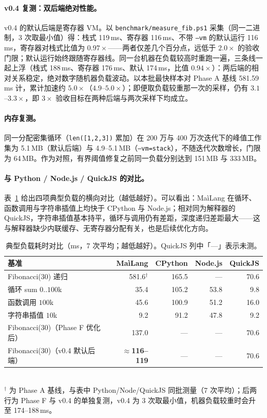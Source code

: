 \documentclass[10pt,a4paper]{article}
\begin{document}
\paragraph{v0.4 复测：双后端绝对性能。}
v0.4 的默认后端是寄存器 VM。以 \texttt{benchmark/measure\_fib.ps1} 采集（同一二进制，3 次取最小值）得：栈式 119\,ms、寄存器 116\,ms、不带 \texttt{--vm} 的默认运行 116\,ms，寄存器对栈式比值为 $0.97\times$——两者仅差几个百分点，远低于 $2.0\times$ 的验收门限；默认运行始终跟随寄存器线。同一台机器在负载较高时重跑一遍，三条线一起上浮（栈式 188\,ms、寄存器 176\,ms、默认 174\,ms，比值 $0.94\times$）：两后端的相对关系稳定，绝对数字随机器负载波动。以本批最快样本对 Phase A 基线 581.59\,ms 计，累计加速约 $5.0\times$（$4.9$--$5.0\times$）；即便取负载较重那一次的采样，仍有 $3.1$--$3.3\times$，即 $3\times$ 验收目标在两种后端与两次采样下均成立。

\paragraph{内存复测。}
同一分配密集循环（\texttt{len([1,2,3])} 累加）在 200 万与 400 万次迭代下的峰值工作集为 5.1\,MB（默认后端）与 4.9--5.1\,MB（\texttt{--vm=stack}），不随迭代次数增长，门限为 64\,MB。作为对照，有界阈值修复之前同一负载分别达到 151\,MB 与 333\,MB。

\paragraph{与 Python / Node.js / QuickJS 的对比。}
表~\ref{tab:bench} 给出四项典型负载的横向对比（越低越好）。可以看出：MaìLang 在循环、函数调用与字符串插值上均快于 CPython 与 Node.js；相对同为解释器的 QuickJS，字符串插值基本持平，循环与调用仍有差距，深度递归差距最大——这与解释器缺少内联缓存、无寄存器分配有关，也是后续优化方向。

\begin{table}[t]
\centering
\caption{典型负载耗时对比（ms，7 次平均；越低越好）。QuickJS 列中「—」表示未测。}
\label{tab:bench}
\small
\begin{tabular}{@{}lrrrr@{}}
\toprule
\textbf{基准} & \textbf{MaìLang} & \textbf{CPython} & \textbf{Node.js} & \textbf{QuickJS} \\
\midrule
Fibonacci(30) 递归 & 581.6$^{\dagger}$ & 165.5 & — & 70.6 \\
循环 sum $0..100$k & 35.4 & 105.2 & 53.8 & 9.8 \\
函数调用 $100$k & 45.6 & 100.9 & 51.2 & 16.0 \\
字符串插值 $10$k & 9.2 & 91.2 & 47.8 & 9.2 \\
\midrule
Fibonacci(30)（Phase F 优化后） & 137.0 & — & — & 70.6 \\
Fibonacci(30)（v0.4 默认后端） & \textbf{$\approx$116--119} & — & — & 70.6 \\
\bottomrule
\end{tabular}
\\[2pt]
{\footnotesize $^{\dagger}$ 为 Phase A 基线，与表中 Python/Node/QuickJS 同批测量（7 次平均）；后两行为 Phase F 与 v0.4 的单独复测，v0.4 为 3 次取最小值，机器负载较重时会升至 174--188\,ms。}
\end{table}
\end{document}
